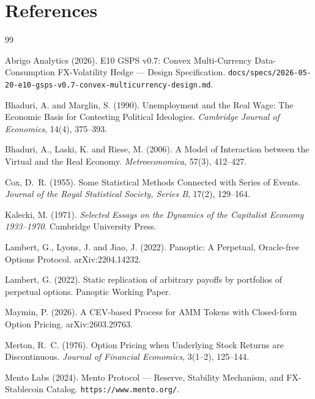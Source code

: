 \documentclass[11pt,letterpaper]{article}
\theoremstyle{assumption}
\begin{document}
\section*{References}
\begin{thebibliography}{99}

Abrigo Analytics (2026).
\newblock E10 GSPS v0.7: Convex Multi-Currency Data-Consumption FX-Volatility Hedge --- Design Specification.
\newblock \texttt{docs/specs/2026-05-20-e10-gsps-v0.7-convex-multicurrency-design.md}.

Bhaduri, A. and Marglin, S. (1990).
\newblock Unemployment and the Real Wage: The Economic Basis for Contesting Political Ideologies.
\newblock \emph{Cambridge Journal of Economics}, 14(4), 375--393.

Bhaduri, A., Laski, K. and Riese, M. (2006).
\newblock A Model of Interaction between the Virtual and the Real Economy.
\newblock \emph{Metroeconomica}, 57(3), 412--427.

Cox, D.~R. (1955).
\newblock Some Statistical Methods Connected with Series of Events.
\newblock \emph{Journal of the Royal Statistical Society, Series B}, 17(2), 129--164.

Kalecki, M. (1971).
\newblock \emph{Selected Essays on the Dynamics of the Capitalist Economy 1933--1970}.
\newblock Cambridge University Press.

Lambert, G., Lyons, J. and Jiao, J. (2022).
\newblock Panoptic: A Perpetual, Oracle-free Options Protocol.
\newblock arXiv:2204.14232.

Lambert, G. (2022).
\newblock Static replication of arbitrary payoffs by portfolios of perpetual options.
\newblock Panoptic Working Paper.

Maymin, P. (2026).
\newblock A CEV-based Process for AMM Tokens with Closed-form Option Pricing.
\newblock arXiv:2603.29763.

Merton, R.~C. (1976).
\newblock Option Pricing when Underlying Stock Returns are Discontinuous.
\newblock \emph{Journal of Financial Economics}, 3(1--2), 125--144.

Mento Labs (2024).
\newblock Mento Protocol --- Reserve, Stability Mechanism, and FX-Stablecoin Catalog.
\newblock \texttt{https://www.mento.org/}.


\end{thebibliography}
\end{document}
